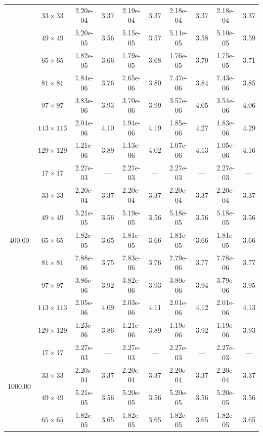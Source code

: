 \documentclass[preprint, 12pt]{elsarticle}
\begin{document}
\begin{center}
\begin{table}[H]
{\begin{tabular*}{\textwidth}{@{\extracolsep\fill}cccccccccc@{}}
    & $33\times 33$ & 2.20e-04 & 3.37 & 2.19e-04 & 3.37 & 2.18e-04 & 3.37 & 2.18e-04 & 3.37 \\
    & $49\times 49$ & 5.20e-05 & 3.56 & 5.15e-05 & 3.57 & 5.11e-05 & 3.58 & 5.10e-05 & 3.59 \\
    & $65\times 65$ & 1.82e-05 & 3.66 & 1.79e-05 & 3.68 & 1.76e-05 & 3.70 & 1.75e-05 & 3.71 \\
    & $81\times 81$ & 7.84e-06 & 3.76 & 7.65e-06 & 3.80 & 7.47e-06 & 3.84 & 7.43e-06 & 3.85 \\
    & $97\times 97$ & 3.83e-06 & 3.93 & 3.70e-06 & 3.99 & 3.57e-06 & 4.05 & 3.54e-06 & 4.06 \\
    & $113\times 113$ & 2.04e-06 & 4.10 & 1.94e-06 & 4.19 & 1.85e-06 & 4.27 & 1.83e-06 & 4.29 \\
    & $129\times 129$ & 1.21e-06 & 3.89 & 1.13e-06 & 4.02 & 1.07e-06 & 4.13 & 1.05e-06 & 4.16 \\
    \hline\hline
    \multirow{7}{*}{400.00} & $17\times 17$ & 2.27e-03 & --- & 2.27e-03 & --- & 2.27e-03 & --- & 2.27e-03 & --- \\
    & $33\times 33$ & 2.20e-04 & 3.37 & 2.20e-04 & 3.37 & 2.20e-04 & 3.37 & 2.20e-04 & 3.37 \\
    & $49\times 49$ & 5.21e-05 & 3.56 & 5.19e-05 & 3.56 & 5.18e-05 & 3.56 & 5.18e-05 & 3.56 \\
    & $65\times 65$ & 1.82e-05 & 3.65 & 1.81e-05 & 3.66 & 1.81e-05 & 3.66 & 1.81e-05 & 3.66 \\
    & $81\times 81$ & 7.88e-06 & 3.75 & 7.83e-06 & 3.76 & 7.79e-06 & 3.77 & 7.78e-06 & 3.77 \\
    & $97\times 97$ & 3.86e-06 & 3.92 & 3.82e-06 & 3.93 & 3.80e-06 & 3.94 & 3.79e-06 & 3.95 \\
    & $113\times 113$ & 2.05e-06 & 4.09 & 2.03e-06 & 4.11 & 2.01e-06 & 4.12 & 2.01e-06 & 4.13 \\
    & $129\times 129$ & 1.23e-06 & 3.86 & 1.21e-06 & 3.89 & 1.19e-06 & 3.92 & 1.19e-06 & 3.93 \\
    \hline\hline
    \multirow{7}{*}{1000.00} & $17\times 17$ & 2.27e-03 & --- & 2.27e-03 & --- & 2.27e-03 & --- & 2.27e-03 & --- \\
    & $33\times 33$ & 2.20e-04 & 3.37 & 2.20e-04 & 3.37 & 2.20e-04 & 3.37 & 2.20e-04 & 3.37 \\
    & $49\times 49$ & 5.21e-05 & 3.56 & 5.20e-05 & 3.56 & 5.20e-05 & 3.56 & 5.20e-05 & 3.56 \\
    & $65\times 65$ & 1.82e-05 & 3.65 & 1.82e-05 & 3.65 & 1.82e-05 & 3.65 & 1.82e-05 & 3.65 \\

\end{tabular*}}
\end{table}
\end{center}
\end{document}
